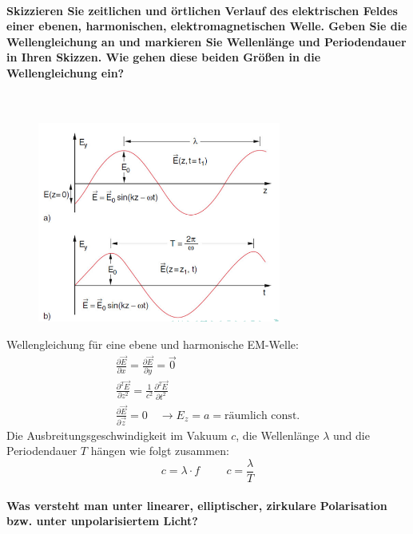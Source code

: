 \documentclass[a4paper, 11pt, ngerman, parskip=half-]{scrartcl}
\begin{document}
\paragraph{Skizzieren Sie zeitlichen und örtlichen Verlauf des elektrischen Feldes einer ebenen,
    harmonischen, elektromagnetischen Welle. Geben Sie die Wellengleichung an und markieren Sie
    Wellenlänge und Periodendauer in Ihren Skizzen. Wie gehen diese beiden Größen in die Wellengleichung
    ein?} ~

\begin{figure}[H]
    \centering
    \includegraphics[width=8cm]{image/13/2.png}
\end{figure}
Wellengleichung für eine ebene und harmonische EM-Welle:
\begin{equation}
    \begin{split}
        \frac{\partial \vec{E}}{\partial x} = \frac{\partial \vec{E}}{\partial y} = \vec{0} \\
        \frac{\partial^2 \vec{E}}{\partial z^2} = \frac{1}{c^2} \frac{\partial^2 \vec{E}}{\partial t^2} \\
        \frac{\partial \vec{E}}{\partial \vec{z}} = 0 \quad \rightarrow E_z = a = \text{räumlich const.}
    \end{split}
\end{equation}
Die Ausbreitungsgeschwindigkeit im Vakuum $c$, die Wellenlänge $\lambda$ und die Periodendauer $T$ hängen wie folgt zusammen:
\begin{equation}
    c = \lambda \cdot f \hspace{1cm}
    c = \frac{\lambda}{T}
\end{equation}
\paragraph{Was versteht man unter linearer, elliptischer, zirkulare Polarisation bzw. unter
    unpolarisiertem Licht?} ~
\end{document}
